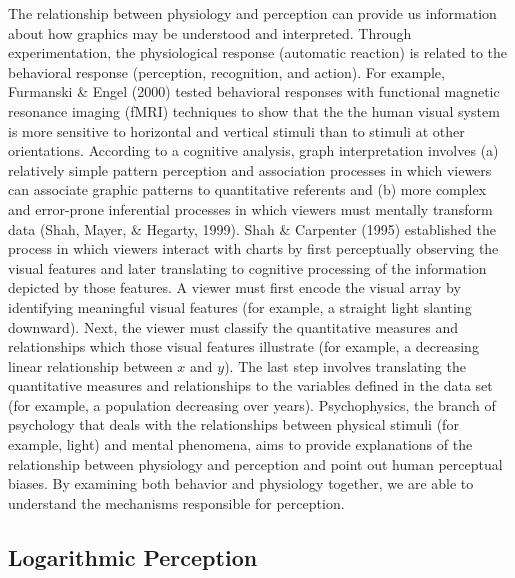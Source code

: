 \documentclass[print]{nuthesis}
\begin{document}
The relationship between physiology and perception can provide us information about how graphics may be understood and interpreted.
Through experimentation, the physiological response (automatic reaction) is related to the behavioral response (perception, recognition, and action).
For example, Furmanski \& Engel (2000) tested behavioral responses with functional magnetic resonance imaging (fMRI) techniques to show that the the human visual system is more sensitive to horizontal and vertical stimuli than to stimuli at other orientations.
According to a cognitive analysis, graph interpretation involves (a) relatively simple pattern perception and association processes in which viewers can associate graphic patterns to quantitative referents and (b) more complex and error-prone inferential processes in which viewers must mentally transform data (Shah, Mayer, \& Hegarty, 1999).
Shah \& Carpenter (1995) established the process in which viewers interact with charts by first perceptually observing the visual features and later translating to cognitive processing of the information depicted by those features.
A viewer must first encode the visual array by identifying meaningful visual features (for example, a straight light slanting downward).
Next, the viewer must classify the quantitative measures and relationships which those visual features illustrate (for example, a decreasing linear relationship between \(x\) and \(y\)).
The last step involves translating the quantitative measures and relationships to the variables defined in the data set (for example, a population decreasing over years).
Psychophysics, the branch of psychology that deals with the relationships between physical stimuli (for example, light) and mental phenomena, aims to provide explanations of the relationship between physiology and perception and point out human perceptual biases.
By examining both behavior and physiology together, we are able to understand the mechanisms responsible for perception.

\hypertarget{logarithmic-perception}{%
\subsection{Logarithmic Perception}\label{logarithmic-perception}}
\end{document}
